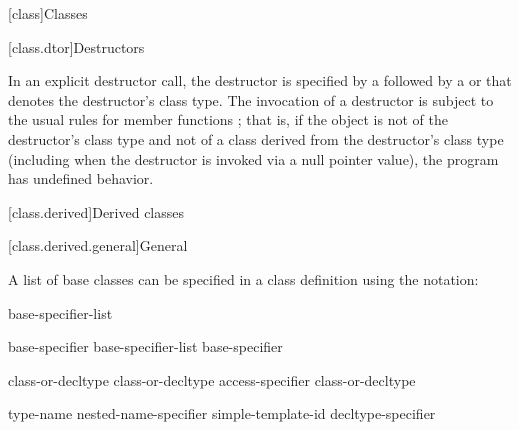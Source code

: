 \documentclass{wg21}
\begin{document}
[class]{Classes}

[class.dtor]{Destructors}%


\pnum
{}%
In an explicit destructor call, the destructor is specified by a
\tcode{\~{}}
followed by a
 or 
that denotes the destructor's class type.
The invocation of a destructor is subject to the usual rules for member
functions ;
that is, if the object is not of the destructor's class type and
not of a class derived from the destructor's class type (including when
the destructor is invoked via a null pointer value), the program has
undefined behavior.

[class.derived]{Derived classes}%

[class.derived.general]{General}%


\pnum
{}%
%
%
A list of base classes can be specified in a class definition using
the notation:

\begin{bnf}
    \br
    \terminal{:} base-specifier-list
\end{bnf}


\begin{bnf}
    \br
    base-specifier \br
    base-specifier-list \terminal{,} base-specifier 
\end{bnf}

\begin{bnf}
    \br
     class-or-decltype\br
       class-or-decltype\br
     access-specifier  class-or-decltype
\end{bnf}

\begin{bnf}
    \br
     type-name\br
    nested-name-specifier  simple-template-id\br
    decltype-specifier\br
\end{bnf}
\end{document}
